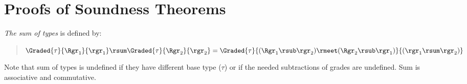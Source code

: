 
\section{ Proofs of Soundness Theorems}

{\em The sum of types} is defined by:
\begin{quote}
$\Graded{\tau}{\Rgr_1}{\rgr_1}\rsum\Graded{\tau}{\Rgr_2}{\rgr_2}=\Graded{\tau}{(\Rgr_1 \rsub \rgr_2) \rmeet (\Rgr_2 \rsub \rgr_1)}{(\rgr_1\rsum\rgr_2)}$ 
\end{quote}
Note that sum of types is undefined if they have different base type ($\tau$) or if the needed subtractions of grades are undefined. Sum is associative and commutative. 

